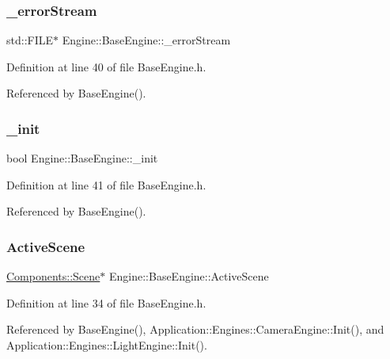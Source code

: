 \subsubsection{\texorpdfstring{\+\_\+error\+Stream}{\_errorStream}}
{\footnotesize\ttfamily std\+::\+F\+I\+LE$\ast$ Engine\+::\+Base\+Engine\+::\+\_\+error\+Stream\hspace{0.3cm}{\ttfamily [private]}}



Definition at line 40 of file Base\+Engine.\+h.



Referenced by Base\+Engine().

\mbox{\label{classEngine_1_1BaseEngine_a79e265845b321c0e9822fb170c564e55}} 
\subsubsection{\texorpdfstring{\+\_\+init}{\_init}}
{\footnotesize\ttfamily bool Engine\+::\+Base\+Engine\+::\+\_\+init\hspace{0.3cm}{\ttfamily [private]}}



Definition at line 41 of file Base\+Engine.\+h.



Referenced by Base\+Engine().

\mbox{\label{classEngine_1_1BaseEngine_adb3dbc839da9d821e08b18d8a221698d}} 
\subsubsection{\texorpdfstring{Active\+Scene}{ActiveScene}}
{\footnotesize\ttfamily \mbox{\hyperlink{classEngine_1_1Components_1_1Scene}{Components\+::\+Scene}}$\ast$ Engine\+::\+Base\+Engine\+::\+Active\+Scene}



Definition at line 34 of file Base\+Engine.\+h.



Referenced by Base\+Engine(), Application\+::\+Engines\+::\+Camera\+Engine\+::\+Init(), and Application\+::\+Engines\+::\+Light\+Engine\+::\+Init().

